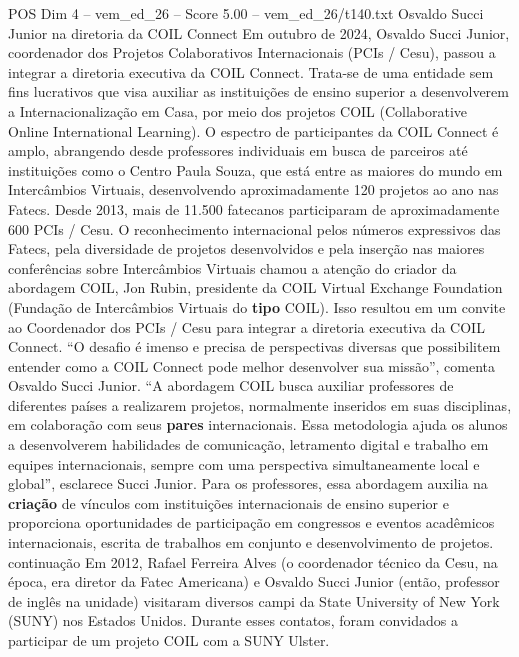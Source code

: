 \begin{textsample}{POS Dim 4 – vem\_ed\_26 – Score 5.00 – vem\_ed\_26/t140.txt}  \label{ex:f4_pos_013}
Osvaldo Succi Junior na diretoria da COIL Connect Em outubro de 2024, Osvaldo Succi Junior, coordenador dos Projetos Colaborativos Internacionais (PCIs / Cesu), passou a integrar a diretoria executiva da COIL Connect.
Trata-se de uma entidade sem fins lucrativos que visa auxiliar as instituições de ensino superior a desenvolverem a Internacionalização em Casa, por meio dos projetos COIL (Collaborative Online International Learning).
O espectro de participantes da COIL Connect é amplo, abrangendo desde professores individuais em busca de parceiros até instituições como o Centro Paula Souza, que está entre as maiores do mundo em Intercâmbios Virtuais, desenvolvendo aproximadamente 120 projetos ao ano nas Fatecs.
Desde 2013, mais de 11.500 fatecanos participaram de aproximadamente 600 PCIs / Cesu.
O reconhecimento internacional pelos números expressivos das Fatecs, pela diversidade de projetos desenvolvidos e pela inserção nas maiores conferências sobre Intercâmbios Virtuais chamou a atenção do criador da abordagem COIL, Jon Rubin, presidente da COIL Virtual Exchange Foundation (Fundação de Intercâmbios Virtuais do \textbf{tipo} COIL).
Isso resultou em um convite ao Coordenador dos PCIs / Cesu para integrar a diretoria executiva da COIL Connect. “O desafio é imenso e precisa de perspectivas diversas que possibilitem entender como a COIL Connect pode melhor desenvolver sua missão”, comenta Osvaldo Succi Junior. “A abordagem COIL busca auxiliar professores de diferentes países a realizarem projetos, normalmente inseridos em suas disciplinas, em colaboração com seus \textbf{pares} internacionais.
Essa metodologia ajuda os alunos a desenvolverem habilidades de comunicação, letramento digital e trabalho em equipes internacionais, sempre com uma perspectiva simultaneamente local e global”, esclarece Succi Junior.
Para os professores, essa abordagem auxilia na \textbf{criação} de vínculos com instituições internacionais de ensino superior e proporciona oportunidades de participação em congressos e eventos acadêmicos internacionais, escrita de trabalhos em conjunto e desenvolvimento de projetos. continuação Em 2012, Rafael Ferreira Alves (o coordenador técnico da Cesu, na época, era diretor da Fatec Americana) e Osvaldo Succi Junior (então, professor de inglês na unidade) visitaram diversos campi da State University of New York (SUNY) nos Estados Unidos.
Durante esses contatos, foram convidados a participar de um projeto COIL com a SUNY Ulster.

\end{textsample}
